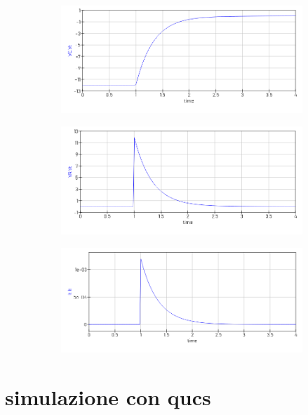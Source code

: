 \documentclass[12pt]{article}
\begin{document}
\begin{figure}[h!]
  \centering
  \begin{subfigure}[b]{0.3\linewidth}
    \includegraphics[width=\linewidth]{data/scarica-VC.png}
  \end{subfigure}
  \begin{subfigure}[b]{0.3\linewidth}
    \includegraphics[width=\linewidth]{data/scarica-VR.png}
  \end{subfigure}
  \begin{subfigure}[b]{0.3\linewidth}
    \includegraphics[width=\linewidth]{data/scarica-IT.png}
  \end{subfigure}
\end{figure}

\newpage

\section*{simulazione con qucs}
\end{document}
